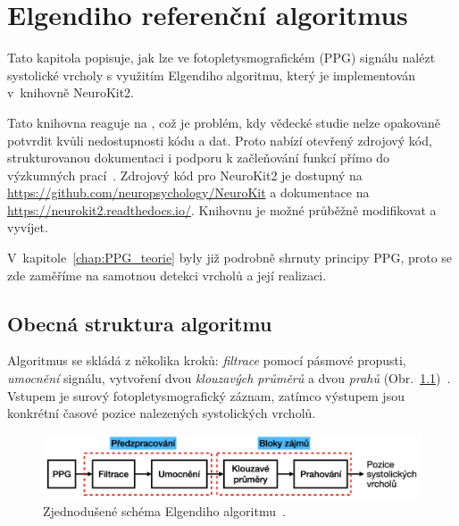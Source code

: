 \chapter{Elgendiho referenční algoritmus}
\label{chap:elgendi_neurokit}

Tato kapitola popisuje, jak lze ve fotopletysmografickém (\acs{PPG}) signálu nalézt systolické vrcholy s využitím Elgendiho algoritmu, který je implementován v~knihovně NeuroKit2.

Tato knihovna reaguje na , což je problém, kdy vědecké studie nelze opakovaně potvrdit kvůli nedostupnosti kódu a dat.
Proto nabízí otevřený zdrojový kód, strukturovanou dokumentaci i podporu k začleňování funkcí přímo do výzkumných prací~\cite{NeuroKit2}.
Zdrojový kód pro NeuroKit2 je dostupný na \url{https://github.com/neuropsychology/NeuroKit} a dokumentace na \url{https://neurokit2.readthedocs.io/}.
Knihovnu je možné průběžně modifikovat a vyvíjet.

V~kapitole~\ref{chap:PPG_teorie} byly již podrobně shrnuty principy \acs{PPG}, proto se zde zaměříme na samotnou detekci vrcholů a její realizaci.

\section{Obecná struktura algoritmu}
\label{sec:alg_structure}

Algoritmus se skládá z několika kroků: \emph{filtrace} pomocí pásmové propusti, \emph{umocnění} signálu, vytvoření dvou \emph{klouzavých průměrů} a dvou \emph{prahů} (Obr.~\ref{fig:alg-scheme})~\cite{Elgendi2013}.
Vstupem je surový fotopletysmografický záznam, zatímco výstupem jsou konkrétní časové pozice nalezených systolických vrcholů.

\begin{figure}[h]
	\centering
	\includegraphics[width=1\textwidth]{./obrazky/ElgendiBlokSchema.png}
	\vspace{-5mm}
	\caption[Struktura Elgendiho algoritmu]{Zjednodušené schéma Elgendiho algoritmu~\cite{Elgendi2013}.}
	\vspace{-5mm}
	\label{fig:alg-scheme}
\end{figure}

